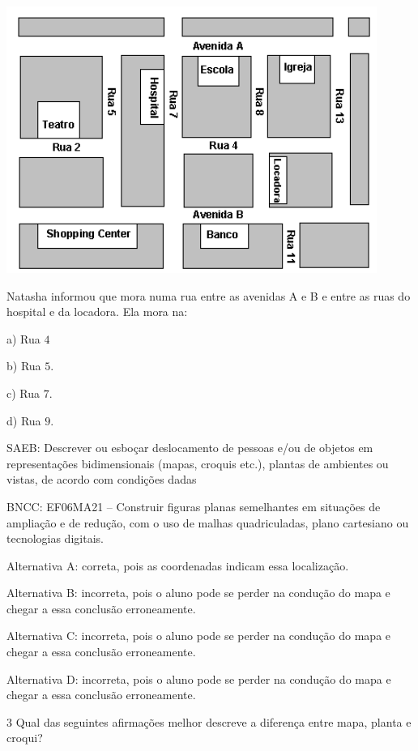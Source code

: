 \includegraphics[width=4.76042in,height=3.42708in]{./imgSAEB_6_MAT/media/image75.png}

Natasha informou que mora numa rua entre as avenidas A e B e entre as
ruas do hospital e da locadora. Ela mora na:

a) Rua $4$

b) Rua $5$.

c) Rua $7$.

d) Rua $9$.

SAEB: Descrever ou esboçar deslocamento de pessoas e/ou de objetos em
representações bidimensionais (mapas, croquis etc.), plantas de
ambientes ou vistas, de acordo com condições dadas

BNCC: EF06MA21 -- Construir figuras planas semelhantes em situações de
ampliação e de redução, com o uso de malhas quadriculadas, plano
cartesiano ou tecnologias digitais.

Alternativa A: correta, pois as coordenadas indicam essa localização.

Alternativa B: incorreta, pois o aluno pode se perder na condução do
mapa e chegar a essa conclusão erroneamente.

Alternativa C: incorreta, pois o aluno pode se perder na condução do
mapa e chegar a essa conclusão erroneamente.

Alternativa D: incorreta, pois o aluno pode se perder na condução do
mapa e chegar a essa conclusão erroneamente.

\num{3}  Qual das seguintes afirmações melhor descreve a diferença entre mapa,
planta e croqui?

